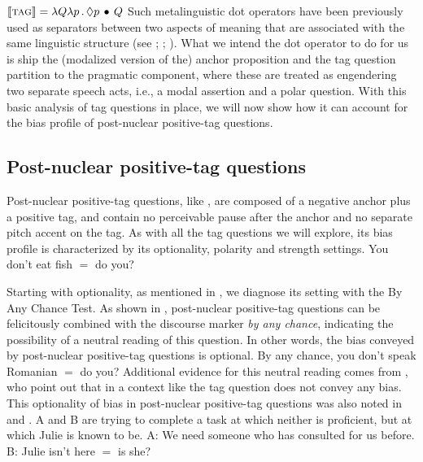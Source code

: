 \documentclass[output=paper,colorlinks,citecolor=brown]{langscibook}
\begin{document}
\is{}
\ea $\llbracket \textsc{tag} \rrbracket  = \lambda Q\lambda p\,.\,\Diamond p \, \bullet \, Q$\label{TAG}
\z
{}
Such metalinguistic dot operators have been previously used as separators between two aspects of meaning that are associated with the same linguistic structure (see \citealt{Pustejovsky1996}; \citealt{potts2005}; \citealt{Asher2011}). What we intend the dot operator to do for us is ship the (modalized version of the) anchor proposition and the tag question partition to the pragmatic component, where these are treated as engendering two separate speech acts, i.e., a modal assertion and a polar question. With this basic analysis of tag questions in place, we will now show how it can account for the bias profile of post-nuclear positive-tag questions.

\subsection{Post-nuclear positive-tag questions}\label{Sec.PNu.Pos}

Post-nuclear positive-tag questions, like , are composed of a negative anchor plus a positive tag, and contain no perceivable pause after the anchor and no separate pitch accent on the tag. As with all the tag questions we will explore, its bias profile is characterized by its optionality, polarity and strength settings.
\is{}
\ea You don't eat fish $=$ do you?\label{Pos.PNu}
\z
{}

Starting with optionality, as mentioned in , we diagnose its setting with the By Any Chance Test. As shown in , post-nuclear positive-tag questions can be felicitously combined with the discourse marker \textit{by any chance}, indicating the possibility of a neutral reading of this question. In other words, the bias conveyed by  post-nuclear positive-tag questions is optional.
\is{}
\ea By any chance, you don't speak Romanian $=$ do you?\label{Pos.PNu.BAC}
\z
{}
Additional evidence for this neutral reading comes from \citet{Reese2009}, who point out that in a context like  the tag question does not convey any bias. This optionality of bias in post-nuclear positive-tag questions was also noted in \citet{sadock1971} and \citet{Ladd1981a}. 
\is{}
\ea A and B are trying to complete a task at which neither is proficient, but at which Julie is known to be.\label{Pos.Pnu.RA}
\sn A: We need someone who has consulted for us before.  
\sn B: Julie isn't here $=$ is she?
\z
{}
\end{document}
